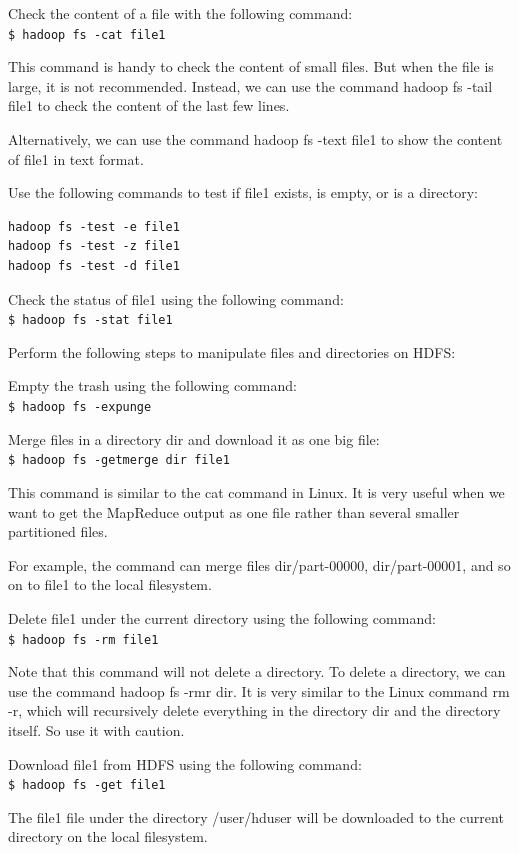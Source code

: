 Check the content of a file with the following command: \\
\verb|$ hadoop fs -cat file1|

This command is handy to check the content of small files. But when the file is large, it is not recommended. Instead, we can use the command hadoop fs -tail file1 to check the content of the last few lines.

Alternatively, we can use the command hadoop fs -text file1 to show the content of file1 in text format.

Use the following commands to test if file1 exists, is empty, or is a directory:
\begin{verbatim}
hadoop fs -test -e file1
hadoop fs -test -z file1
hadoop fs -test -d file1
\end{verbatim}

Check the status of file1 using the following command: \\
\verb|$ hadoop fs -stat file1|

Perform the following steps to manipulate files and directories on HDFS:

Empty the trash using the following command: \\
\verb|$ hadoop fs -expunge|

Merge files in a directory dir and download it as one big file:\\
\verb|$ hadoop fs -getmerge dir file1|

This command is similar to the cat command in Linux. It is very useful when we want to get the MapReduce output as one file rather than several smaller partitioned files.

For example, the command can merge files dir/part-00000, dir/part-00001, and so on to file1 to the local filesystem.

Delete file1 under the current directory using the following command:\\
\verb|$ hadoop fs -rm file1|

Note that this command will not delete a directory. To delete a directory, we can use the command hadoop fs -rmr dir. It is very similar to the Linux command rm -r, which will recursively delete everything in the directory dir and the directory itself. So use it with caution.

Download file1 from HDFS using the following command: \\
\verb|$ hadoop fs -get file1|

The file1 file under the directory /user/hduser will be downloaded to the current directory on the local filesystem.


